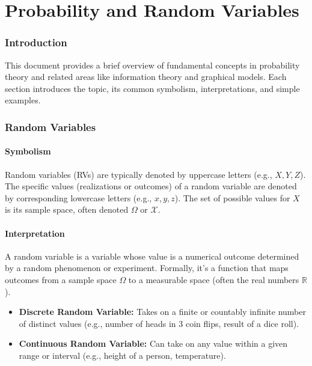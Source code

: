 \documentclass{article}
\newcommand{\R}{\mathbb{R}}    %
\begin{document}
\newpage
\part{Probability and Random Variables}

\section{Introduction}
This document provides a brief overview of fundamental concepts in probability theory and related areas like information theory and graphical models. Each section introduces the topic, its common symbolism, interpretations, and simple examples.

\section{Random Variables}

\subsection*{Symbolism}
Random variables (RVs) are typically denoted by uppercase letters (e.g., $X, Y, Z$). The specific values (realizations or outcomes) of a random variable are denoted by corresponding lowercase letters (e.g., $x, y, z$). The set of possible values for $X$ is its sample space, often denoted $\Omega$ or $\mathcal{X}$.

\subsection*{Interpretation}
A random variable is a variable whose value is a numerical outcome determined by a random phenomenon or experiment. Formally, it's a function that maps outcomes from a sample space $\Omega$ to a measurable space (often the real numbers $\R$).
\begin{itemize}
    \item \textbf{Discrete Random Variable:} Takes on a finite or countably infinite number of distinct values (e.g., number of heads in 3 coin flips, result of a dice roll).
    \item \textbf{Continuous Random Variable:} Can take on any value within a given range or interval (e.g., height of a person, temperature).
\end{itemize}
\end{document}
